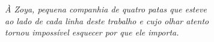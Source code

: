 \begin{dedicatoria}
   \vspace*{\fill}
   \begin{flushright}
      \noindent
      \textit{
         À Zoya, pequena companhia de quatro patas que esteve\\
         ao lado de cada linha deste trabalho e cujo olhar atento\\
         tornou impossível esquecer por que ele importa.
      }
   \end{flushright}
   \vspace*{\fill}
\end{dedicatoria}
